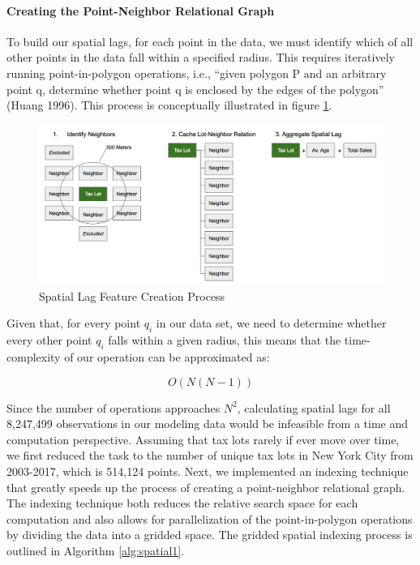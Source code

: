 \documentclass[12pt,]{article}
\let\oldparagraph\paragraph
\renewcommand{\paragraph}[1]{\oldparagraph{#1}\mbox{}}
\begin{document}
\hypertarget{creating-the-point-neighbor-relational-graph}{%
\paragraph{Creating the Point-Neighbor Relational
Graph}\label{creating-the-point-neighbor-relational-graph}}

To build our spatial lags, for each point in the data, we must identify
which of all other points in the data fall within a specified radius.
This requires iteratively running point-in-polygon operations, i.e.,
``given polygon P and an arbitrary point q, determine whether point q is
enclosed by the edges of the polygon'' (Huang 1996). This process is
conceptually illustrated in figure
\ref{fig:Spatial Lag Feataure Process}.

\begin{figure}[H]
\includegraphics[width=1\linewidth]{Sections/tables and figures/Spatial Lag Creation} \caption{Spatial Lag Feature Creation Process}\label{fig:Spatial Lag Feataure Process}
\end{figure}

Given that, for every point \(q_i\) in our data set, we need to
determine whether every other point \(q_i\) falls within a given radius,
this means that the time-complexity of our operation can be approximated
as:

\[
O(N(N-1))
\]

Since the number of operations approaches \(N^2\), calculating spatial
lags for all 8,247,499 observations in our modeling data would be
infeasible from a time and computation perspective. Assuming that tax
lots rarely if ever move over time, we first reduced the task to the
number of unique tax lots in New York City from 2003-2017, which is
514,124 points. Next, we implemented an indexing technique that greatly
speeds up the process of creating a point-neighbor relational graph. The
indexing technique both reduces the relative search space for each
computation and also allows for parallelization of the point-in-polygon
operations by dividing the data into a gridded space. The gridded
spatial indexing process is outlined in Algorithm \ref{alg:spatial1}.
\end{document}
